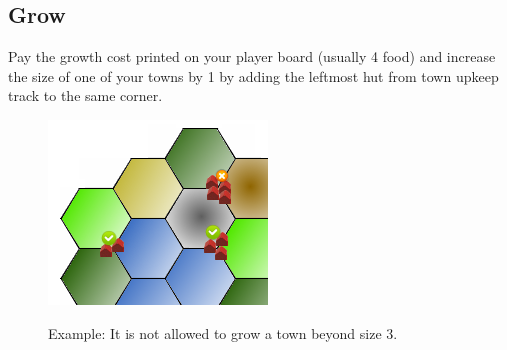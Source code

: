 \documentclass[11pt,a4paper,titlepage]{article}
\begin{document}
{  \subsection{Grow}{
    Pay the growth cost printed on your player board (usually 4 food) and
    increase the size of one of your towns by 1 by adding the leftmost hut
    from town upkeep track to the same corner.
    \begin{figure}[!htb]
      \begin{minipage}[c]{0.2\textwidth}
        \label{fig:tech_irrigation}
        \includegraphics[scale=.6]{doe_example_grow.png}
      \end{minipage}\hfill
      \begin{minipage}[c]{0.4\textwidth}
        \captionsetup{labelformat=empty, justification=justified, singlelinecheck=false}
        \caption{Example: It is not allowed to grow a town beyond size 3.}
      \end{minipage}\hfill
      \label{fig:example_grow}
    \end{figure}
  }\label{subsec:grow}
}\label{sec:player_turn}
\end{document}
